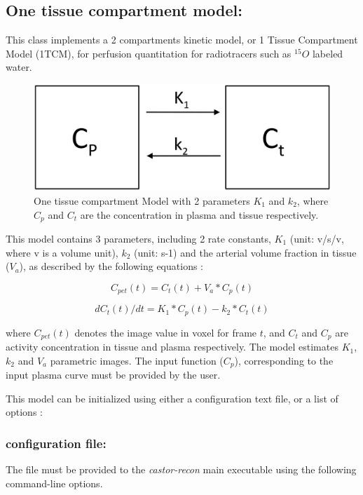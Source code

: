 \documentclass[a4paper, 11pt]{article}
\begin{document}
\newpage
\subsection{One tissue compartment model:}
\label{ss_1TCM}

This class implements a 2 compartments kinetic model, or 1 Tissue Compartment Model (1TCM), for perfusion quantitation for radiotracers such as $^{15}O$ labeled water.

\begin{figure} [h!]
  \centering
  \includegraphics[width=0.4\columnwidth]{./figures/dynamic_1TCModel.eps}
  \caption{One tissue compartment Model with 2 parameters $K_1$ and $k_2$, where $C_p$ and $C_t$ are the concentration in plasma and tissue respectively.}
  \label{fig_1TCM}
\end{figure}

This model contains 3 parameters, including 2 rate constants, $K_1$ (unit: v/s/v, where v is a volume unit), $k_2$ (unit: s-1) and the arterial volume fraction in tissue ($V_a$), as described by the following equations :

\begin{equation}
C_{pet} ( t )    = C_t( t )    + V_a*C_p( t )
\label{eq_1TCM_CPET}
\end{equation}

\begin{equation}
dC_t( t ) / dt = K_1*C_p( t ) - k_2*C_t( t )
\label{eq_1TCM_CT}
\end{equation}

where $C_{pet}(t)$ denotes the image value in voxel for frame $t$, and $C_t$ and $C_p$ are activity concentration in tissue and plasma respectively. The model estimates $K_1$, $k_2$ and $V_a$ parametric images.
The input function ($C_p$), corresponding to the input plasma curve must be provided by the user.

\bigskip
This model can be initialized using either a configuration text file, or a list of options :

\subsubsection{configuration file:}
\label{sss_1TCM_cfile}

The file must be provided to the \textit{castor-recon} main executable using the following command-line options.
\end{document}
